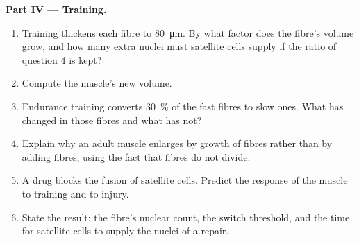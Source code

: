 \begin{problem}
\medskip
\noindent\textbf{Part IV --- Training.}
\begin{enumerate}[resume]
  \item Training thickens each fibre to \qty{80}{\micro m}. By what
        factor does the fibre's volume grow, and how many extra
        nuclei must satellite cells supply if the ratio of
        question 4 is kept?
  \item Compute the muscle's new volume.
  \item Endurance training converts \qty{30}{\%} of the fast fibres
        to slow ones. What has changed in those fibres and what has
        not?
  \item Explain why an adult muscle enlarges by growth of fibres
        rather than by adding fibres, using the fact that fibres do
        not divide.
  \item A drug blocks the fusion of satellite cells. Predict the
        response of the muscle to training and to injury.
  \item State the result: the fibre's nuclear count, the switch
        threshold, and the time for satellite cells to supply the
        nuclei of a repair.
\end{enumerate}
\end{problem}
